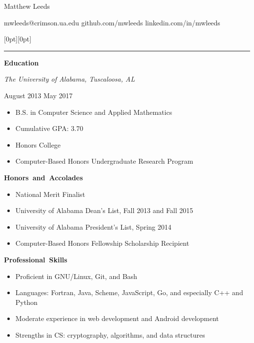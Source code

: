 \documentclass[11pt]{article}
\begin{document}
\centerline{\huge Matthew Leeds}
\vspace{0.4em}
\centerline{\normalsize mwleeds@crimson.ua.edu \space \textbar \space github.com/mwleeds \space \textbar \space linkedin.com/in/mwleeds}

\noindent \begin{minipage}[t]{1.04\textwidth}
\raisebox{9pt}[0pt][0pt]{\rule{\textwidth}{0.2mm}\hspace{-\textwidth}}
\end{minipage}

\vspace{0.8em}
\hbox{\large \textbf{Education}}

\begin{minipage}[t]{0.7\textwidth}
\flushleft
\textit{The University of Alabama, Tuscaloosa, AL}\\
\end{minipage}
\begin{minipage}[t]{0.3\textwidth}
\flushright
August 2013 \space \textemdash \space May 2017\\
\end{minipage}

\begin{itemize}
  \item B.S. in Computer Science and Applied Mathematics
  \item Cumulative GPA: 3.70
  \item Honors College
  \item Computer-Based Honors Undergraduate Research Program
\end{itemize}

\vspace{0.8em}
\hbox{\large \textbf{Honors and Accolades}}

\begin{itemize}
  \item National Merit Finalist
  \item University of Alabama Dean's List, Fall 2013 and Fall 2015
  \item University of Alabama President's List, Spring 2014
  \item Computer-Based Honors Fellowship Scholarship Recipient
\end{itemize}

\vspace{0.8em}
\hbox{\large \textbf{Professional Skills}}

\begin{itemize}
  \item Proficient in GNU/Linux, Git, and Bash
  \item Languages: Fortran, Java, Scheme, JavaScript, Go, and especially C++ and Python
  \item Moderate experience in web development and Android development
  \item Strengths in CS: cryptography, algorithms, and data structures
\end{itemize}
\end{document}
